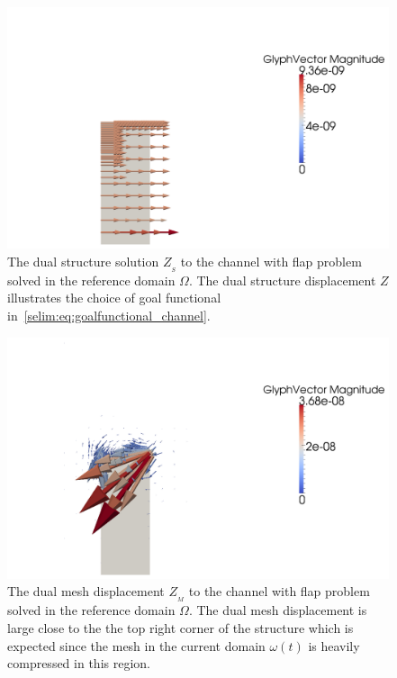 \begin{figure}
  \label{selim:fig:dual_channel_ZS}
\caption{The dual structure solution $Z_{_{S}}$ to the channel with
  flap problem solved in the reference domain $\Omega$. The dual
  structure displacement $Z$ illustrates the choice of goal
  functional in~\eqref{selim:eq:goalfunctional_channel}.}
\includegraphics[width=1.0\textwidth]{chapters/selim/png/channelZS.png}
\end{figure}
\begin{figure}
  \label{selim:fig:dual_channel_ZM}
\caption{The dual mesh displacement $Z_{_{M}}$ to the channel with
  flap problem solved in the reference domain $\Omega$. The dual mesh
  displacement is large close to the the top right corner of the
  structure which is expected since the mesh in the current domain
  $\omega(t)$ is heavily compressed in this region.}
\includegraphics[width=1.0\textwidth]{chapters/selim/png/channelZM.png}
\end{figure}

